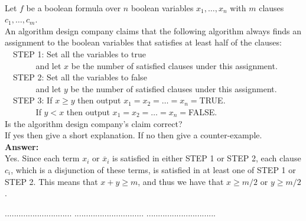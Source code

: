 \documentclass[a4paper,11pt]{article}
\begin{document}
\\
Let $f$ be a boolean formula over $n$ boolean variables $x_1, \ldots , x_n$
with $m$ clauses $c_1, \ldots , c_m$. \\
An algorithm design company claims that the following algorithm always finds an assignment  to
the boolean variables that satisfies at least half of the clauses: \\
$~~~$ STEP 1: Set all the variables to true \\
$~~~~~~~~~~~~~~~~~$and let $x$ be the number of satisfied clauses under this assignment.\\
$~~~$ STEP 2: Set all the variables to false \\
$~~~~~~~~~~~~~~~~~$and let $y$ be the number of satisfied clauses under this assignment.\\
$~~~$ STEP 3: If $x\geq y$ then output $x_1=x_2=\ldots =x_n=$TRUE.\\
$~~~~~~~~~~~~~~~~~$If $y<x$  then output $x_1=x_2=\ldots =x_n=$FALSE.\\
Is the algorithm design company's claim correct?\\
If yes then give a short explanation.
If no then give a counter-example.\\
{\bf Answer:}\\
Yes. Since each term $x_i$ or $\overline{x}_i$ is satisfied in either STEP 1 or STEP 2, each clause $c_i$, which is a disjunction of these terms, is satisfied in at least one of STEP 1 or STEP 2. This means that $x + y \geq m$, and thus we have that $x \geq m/2$ or $y \geq m/2$.

\pagebreak

 $.............................$
 $..............................$
          $..............................$\\

\bigskip
\end{document}
